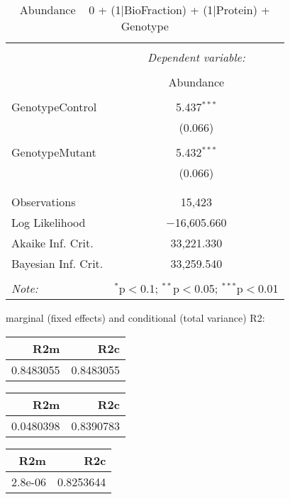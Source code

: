 \documentclass[11pt]{report}
\begin{document}
\begin{table}[!htbp] \centering 
  \caption{Abundance ~ 0 + (1|BioFraction) + (1|Protein) + Genotype} 
  \label{} 
\begin{tabular}{@{\extracolsep{5pt}}lc} 
\\[-1.8ex]\hline 
\hline \\[-1.8ex] 
 & \multicolumn{1}{c}{\textit{Dependent variable:}} \\ 
\cline{2-2} 
\\[-1.8ex] & Abundance \\ 
\hline \\[-1.8ex] 
 GenotypeControl & 5.437$^{***}$ \\ 
  & (0.066) \\ 
  & \\ 
 GenotypeMutant & 5.432$^{***}$ \\ 
  & (0.066) \\ 
  & \\ 
\hline \\[-1.8ex] 
Observations & 15,423 \\ 
Log Likelihood & $-$16,605.660 \\ 
Akaike Inf. Crit. & 33,221.330 \\ 
Bayesian Inf. Crit. & 33,259.540 \\ 
\hline 
\hline \\[-1.8ex] 
\textit{Note:}  & \multicolumn{1}{r}{$^{*}$p$<$0.1; $^{**}$p$<$0.05; $^{***}$p$<$0.01} \\ 
\end{tabular} 
\end{table} 
marginal (fixed effects) and conditional (total variance) R2:

\begin{tabular}{r|r}
\hline
R2m & R2c\\
\hline
0.8483055 & 0.8483055\\
\hline
\end{tabular}

\begin{tabular}{r|r}
\hline
R2m & R2c\\
\hline
0.0480398 & 0.8390783\\
\hline
\end{tabular}

\begin{tabular}{r|r}
\hline
R2m & R2c\\
\hline
2.8e-06 & 0.8253644\\
\hline
\end{tabular}
\end{document}
